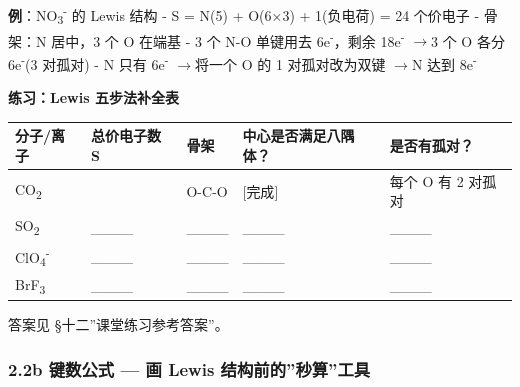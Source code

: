 \documentclass[a4paper,11pt]{ctexart}
\newcounter{none}
\newcommand{\箭}{\ensuremath{\rightarrow}}
\newcommand{\左箭}{\ensuremath{\leftarrow}}
\newcommand{\上箭}{\ensuremath{\uparrow}}
\newcommand{\下箭}{\ensuremath{\downarrow}}
\newcommand{\衡}{\ensuremath{\rightleftharpoons}}
\newcommand{\双箭}{\ensuremath{\leftrightarrow}}
\newcommand{\约等于}{\ensuremath{\approx}}
\newcommand{\小于等于}{\ensuremath{\leq}}
\newcommand{\大于等于}{\ensuremath{\geq}}
\newcommand{\不等于}{\ensuremath{\neq}}
\newcommand{\西格马}{\ensuremath{\sigma}}
\newcommand{\派}{\ensuremath{\pi}}
\begin{document}
\textbf{例}：NO\textsubscript{3}\textsuperscript{-} 的 Lewis 结构
- S = N(5) + O(6×3) + 1(负电荷) = 24 个价电子
- 骨架：N 居中，3 个 O 在端基
- 3 个 N-O 单键用去 6e\textsuperscript{-}，剩余 18e\textsuperscript{-} \箭 3 个 O 各分 6e\textsuperscript{-}(3 对孤对)
- N 只有 6e\textsuperscript{-} \箭 将一个 O 的 1 对孤对改为双键 \箭 N 达到 8e\textsuperscript{-}

\textbf{练习：Lewis 五步法补全表}

{\def\LTcaptype{none} %
\begin{longtable}[]{@{}
  >{\centering\arraybackslash}p{}
  >{\centering\arraybackslash}p{}
  >{\raggedright\arraybackslash}p{}
  >{\centering\arraybackslash}p{}
  >{\centering\arraybackslash}p{}@{}}
\toprule\noalign{}
\begin{minipage}[b]{\linewidth}\centering
分子/离子
\end{minipage} & \begin{minipage}[b]{\linewidth}\centering
总价电子数 S
\end{minipage} & \begin{minipage}[b]{\linewidth}\raggedright
骨架
\end{minipage} & \begin{minipage}[b]{\linewidth}\centering
中心是否满足八隅体？
\end{minipage} & \begin{minipage}[b]{\linewidth}\centering
是否有孤对？
\end{minipage} \\
\midrule\noalign{}
\endhead
\bottomrule\noalign{}
\endlastfoot
CO\textsubscript{2} & 16 & O-C-O & {[}完成{]} & 每个 O 有 2 对孤对 \\
SO\textsubscript{2} & \_\_\_\_ & \_\_\_\_ & \_\_\_\_ & \_\_\_\_ \\
ClO\textsubscript{4}\textsuperscript{-} & \_\_\_\_ & \_\_\_\_ & \_\_\_\_ & \_\_\_\_ \\
BrF\textsubscript{3} & \_\_\_\_ & \_\_\_\_ & \_\_\_\_ & \_\_\_\_ \\
\end{longtable}
}

答案见 §十二''课堂练习参考答案''。

\subsubsection{2.2b 键数公式 --- 画 Lewis 结构前的''秒算''工具}\label{b-ux952eux6570ux516cux5f0f-ux753b-lewis-ux7ed3ux6784ux524dux7684ux79d2ux7b97ux5de5ux5177}
\end{document}

